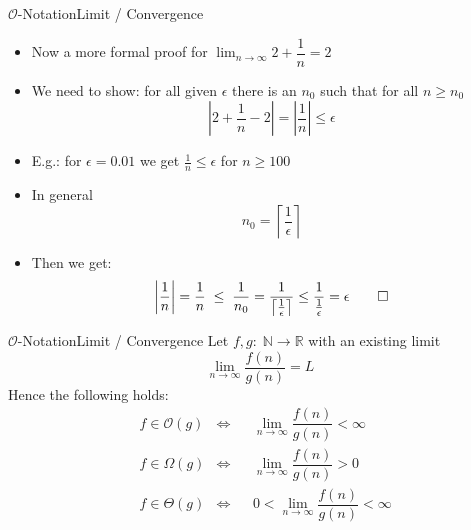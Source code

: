 \begin{frame}{$\mathcal{O}$-Notation}{Limit / Convergence}
  \begin{itemize}
  \item Now a more formal proof for $\displaystyle\lim_{n \to \infty} 2 +
    \dfrac{1}{n}  = 2$
  \item We need to show: for all given $\epsilon$ there is an $n_0$ such
    that for all $n \geq n_0$
    \begin{displaymath}
      \left| 2 + \dfrac{1}{n} - 2 \right| =  \left| \dfrac{1}{n}  \right| \leq \epsilon
    \end{displaymath}
  \item<2- |handout:1>
    E.g.: for $\epsilon=0.01$ we get $\frac{1}{n} \leq \epsilon$
    for $n\geq 100$
  \item<3- |handout:1>
    In general
    \begin{displaymath}
      n_0 = \left\lceil \dfrac{1}{\epsilon} \right\rceil
    \end{displaymath}
  \item<4- |handout:1>
    Then we get:
    \begin{eqnarray*}
      \left|
        \frac{1}{n} \vphantom{\dfrac{1}{\frac{1}{\epsilon}}}
      \right| = \dfrac{1}{n}
      \; \leq \;
      \dfrac{1}{n_0} = \dfrac{1}{\left\lceil\frac{1}{\epsilon}\right\rceil}
      \leq \dfrac{1}{\frac{1}{\epsilon}}
      = \epsilon \qed
    \end{eqnarray*}
  \end{itemize}
\end{frame}


\begin{frame}{$\mathcal{O}$-Notation}{Limit / Convergence}
  \label{slide:fraction}
  Let $f,g \! : \; \mathbb{N} \to \mathbb{R}$ with an existing limit
  \[\lim_{n \to \infty} \dfrac{f(n)}{g(n)} = L\]
  Hence the following holds:
  \begin{align}
    \label{eq:big-O}
    & f \in \mathcal{O}(g) & \Leftrightarrow
    && \lim_{n \to \infty} \dfrac{f(n)}{g(n)} < \infty\\
    & f \in \Omega(g) & \Leftrightarrow
    && \lim_{n \to \infty} \dfrac{f(n)}{g(n)} > 0\\
    & f \in \Theta(g) & \Leftrightarrow
    && 0 < \lim_{n \to \infty} \dfrac{f(n)}{g(n)} < \infty
  \end{align}
\end{frame}

